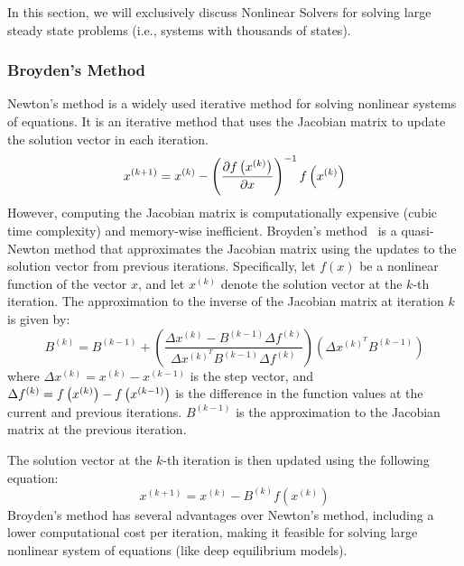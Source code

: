 In this section, we will exclusively discuss Nonlinear Solvers for solving large steady state problems (i.e., systems with thousands of states).

\subsubsection{Broyden's Method}
\label{subsubsec:broyden_method}

Newton's method is a widely used iterative method for solving nonlinear systems of equations. It is an iterative method that uses the Jacobian matrix to update the solution vector in each iteration.
%
\begin{equation}
  x^{(k+1)} = x^{(k)} - \left( \frac{\partial f\left(x^{(k)}\right)}{\partial x} \right)^{-1} f\left(x^{(k)}\right) \label{eq:newton_method}
\end{equation}
%
However, computing the Jacobian matrix is computationally expensive (cubic time complexity) and memory-wise inefficient. Broyden's method~\citep{broyden1965class} is a quasi-Newton method that approximates the Jacobian matrix using the updates to the solution vector from previous iterations. Specifically, let $f(x)$ be a nonlinear function of the vector $x$, and let $x^{(k)}$ denote the solution vector at the $k$-th iteration. The approximation to the inverse of the Jacobian matrix at iteration $k$ is given by:
%
\begin{equation}
  B^{(k)} = B^{(k-1)} + \left(\frac{\Delta x^{(k)} - B^{(k - 1)} \Delta f^{(k)}}{\Delta x^{(k)^T} B^{(k - 1)} \Delta f^{(k)}}\right) \left(\Delta x^{(k)^T} B^{(k - 1)}\right)
\end{equation}
%
where $\Delta x^{(k)} = x^{(k)} - x^{(k-1)}$ is the step vector, and $\Delta f^{(k)} = f\left(x^{(k)}\right) - f\left(x^{(k-1)}\right)$ is the difference in the function values at the current and previous iterations. $B^{(k-1)}$ is the approximation to the Jacobian matrix at the previous iteration.

The solution vector at the $k$-th iteration is then updated using the following equation:
%
\begin{equation}
  x^{(k+1)} = x^{(k)} - B^{(k)}f(x^{(k)})
\end{equation}
%
Broyden's method has several advantages over Newton's method, including a lower computational cost per iteration, making it feasible for solving large nonlinear system of equations (like deep equilibrium models).



